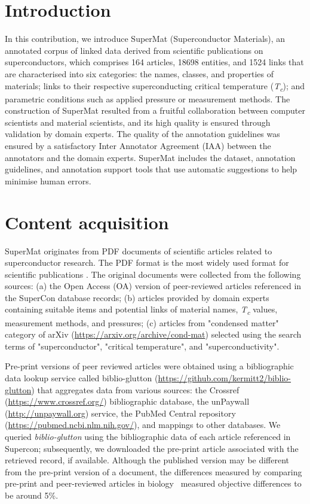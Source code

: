 \section{Introduction}

In this contribution, we introduce SuperMat (Superconductor Materials), an annotated corpus of linked data derived from scientific publications on superconductors, which comprises 164 articles, 18698 entities, and 1524 links that are characterised into six categories: the names, classes, and properties of materials; links to their respective superconducting critical temperature (\textit{T\textsubscript{c}}); and parametric conditions such as applied pressure or measurement methods.
The construction of SuperMat resulted from a fruitful collaboration between computer scientists and material scientists, and its high quality is ensured through validation by domain experts. 
The quality of the annotation guidelines was ensured by a satisfactory Inter Annotator Agreement (IAA) between the annotators and the domain experts. 
SuperMat includes the dataset, annotation guidelines, and annotation support tools that use automatic suggestions to help minimise human errors.

\label{content-acquisition}
\section{Content acquisition}
SuperMat originates from PDF documents of scientific articles related to superconductor research. 
The PDF format is the most widely used format for scientific publications \cite{johnson2018pdfStatistics}.
The original documents were collected from the following sources: (a) the Open Access (OA) version of peer-reviewed articles referenced in the SuperCon database records; 
(b) articles provided by domain experts containing suitable items and potential links of material names, \textit{T\textsubscript{c}} values, measurement methods, and pressures; (c) articles from "condensed matter" category of arXiv (\url{https://arxiv.org/archive/cond-mat}) selected using the search terms of "superconductor", "critical temperature", and "superconductivity". 

Pre-print versions of peer reviewed articles were obtained using a bibliographic data lookup service called biblio-glutton (\url{https://github.com/kermitt2/biblio-glutton}) that aggregates data from various sources: the Crossref (\url{https://www.crossref.org/}) bibliographic database, the unPaywall (\url{http://unpaywall.org}) service, the PubMed Central repository (\url{https://pubmed.ncbi.nlm.nih.gov/}), and mappings to other databases. 
We queried \textit{biblio-glutton} using the bibliographic data of each article referenced in Supercon; subsequently, we downloaded the pre-print article associated with the retrieved record, if available. 
Although the published version may be different from the pre-print version of a document, the differences measured by comparing pre-print and peer-reviewed articles in biology~\cite{carneiro_comparing_2020} measured objective differences to be around 5\%.


